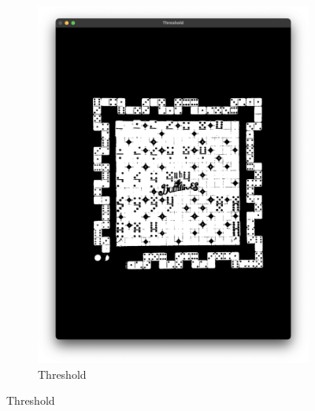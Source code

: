 \documentclass[12pt]{article}
\begin{document}
\begin{figure}[!h]
\begin{subfigure}{.5\textwidth}
            \includegraphics[width=0.9\linewidth]
            {images/board_extraction/threshold.png}
            \caption{Threshold}
            \label{fig:be-threshold}
        \end{subfigure}
    \end{figure}
\end{document}
